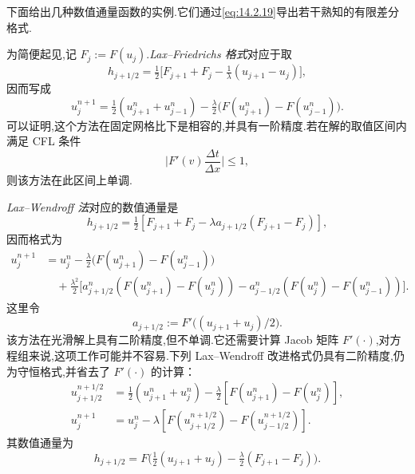 下面给出几种数值通量函数的实例.它们通过\eqref{eq:14.2.19}导出若干熟知的有限差分格式.

\begin{example}\label{ex:14.2.lf}
为简便起见,记 \(F_j:=F(u_j)\).\emph{Lax--Friedrichs 格式}对应于取
\begin{equation}\label{eq:14.2.22}
  h_{j+1/2}=\tfrac12\bigl[F_{j+1}+F_j-\tfrac1\lambda(u_{j+1}-u_j)\bigr],
\end{equation}
因而写成
\begin{equation}\label{eq:14.2.23}
  u_j^{n+1}=\tfrac12(u_{j+1}^n+u_{j-1}^n)
              -\tfrac{\lambda}{2}\bigl(F(u_{j+1}^n)-F(u_{j-1}^n)\bigr).
\end{equation}
可以证明,这个方法在固定网格比下是相容的,并具有一阶精度.若在解的取值区间内满足 CFL 条件
\[
  \biggl|F'(v)\frac{\Delta t}{\Delta x}\biggr|\le1,
\]
则该方法在此区间上单调.
\end{example}

\begin{example}\label{ex:14.2.lw}
\emph{Lax--Wendroff 法}对应的数值通量是
\begin{equation}\label{eq:14.2.24}
  h_{j+1/2}=\tfrac12[F_{j+1}+F_j-\lambda a_{j+1/2}(F_{j+1}-F_j)],
\end{equation}
因而格式为
\begin{equation}\label{eq:14.2.25}
  \begin{aligned}
    u_j^{n+1}
      &=u_j^n-\tfrac{\lambda}{2}\bigl(F(u_{j+1}^n)-F(u_{j-1}^n)\bigr)\\
      &\quad+\tfrac{\lambda^2}{2}\bigl[a_{j+1/2}^n(F(u_{j+1}^n)-F(u_j^n))
                 -a_{j-1/2}^n(F(u_j^n)-F(u_{j-1}^n))\bigr].
  \end{aligned}
\end{equation}
这里令
\[
  a_{j+1/2}:=F'\bigl((u_{j+1}+u_j)/2\bigr).
\]
该方法在光滑解上具有二阶精度,但不单调.它还需要计算 Jacob 矩阵 \(F'(\cdot)\),对方程组来说,这项工作可能并不容易.下列 Lax--Wendroff 改进格式仍具有二阶精度,仍为守恒格式,并省去了 \(F'(\cdot)\) 的计算：
\begin{equation}\label{eq:14.2.26}
  \begin{aligned}
    u_{j+1/2}^{n+1/2}
       &=\tfrac12(u_{j+1}^n+u_j^n)-\tfrac{\lambda}{2}[F(u_{j+1}^n)-F(u_j^n)],\\
    u_j^{n+1}
       &=u_j^n-\lambda[F(u_{j+1/2}^{n+1/2})-F(u_{j-1/2}^{n+1/2})].
  \end{aligned}
\end{equation}
其数值通量为
\begin{equation}\label{eq:14.2.27}
  h_{j+1/2}=F\bigl(\tfrac12(u_{j+1}+u_j)-\tfrac{\lambda}{2}(F_{j+1}-F_j)\bigr).
\end{equation}
\end{example}

